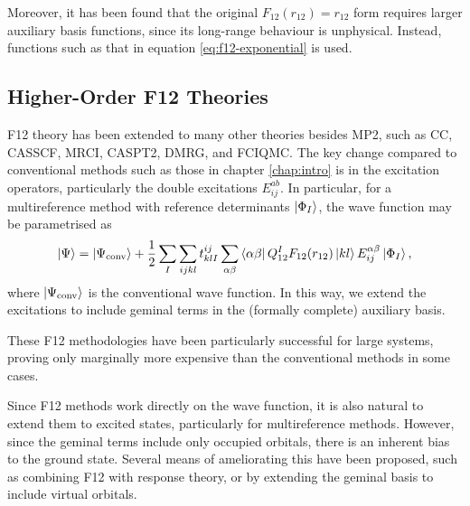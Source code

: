 Moreover, it has been found that the original $F_{12}(r_{12})=r_{12}$ form requires larger auxiliary basis functions, since its long-range behaviour is unphysical.\supercite{ten-noInitiation2004,ten-noNew2007} Instead, functions such as that in equation \ref{eq:f12-exponential} is used.

\subsection{Higher-Order F12 Theories}

F12 theory has been extended to many other theories besides MP2, such as \gls{CC}, \gls{CASSCF}, \gls{MRCI}, \gls{CASPT2}, \gls{DMRG}, and \gls{FCIQMC}.
\supercite{shiozakiMultireference2013,nogaCCR121992,nogaCoupled1994,gdanitzFormulation1993,gdanitzAccurately1998,flieglCoupledcluster2006,neissExtensions2006,kohnModified2009,bokhanCommunications2010,hofenerExtended2019,kedzuchMultireference2011,manbyExplicitly2006,neeseEfficient2009,wernerExplicitly2017,varganovVariational2010,ten-noSimple2007,shiozakiCommunication2010,sharmaSpectroscopic2014}
The key change compared to conventional methods such as those in chapter \ref{chap:intro} is in the excitation operators, particularly the double excitations $E_{ij}^{ab}$. In particular, for a multireference method with reference determinants $\ket{\Phi_I}$, the wave function may be parametrised as
\begin{equation}
    \ket\Psi = \ket{\Psi_\text{conv}} + \frac 12\sum_{I}\sum_{ijkl}t^{ij}_{klI}\sum_{\alpha\beta}\bra{\alpha\beta}Q_{12}^IF_{12}(r_{12})\ket{kl}E_{ij}^{\alpha\beta}\ket{\Phi_I},
\end{equation}
where $\ket{\Psi_\text{conv}}$ is the conventional wave function. In this way, we extend the excitations to include geminal terms in the (formally complete) auxiliary basis.

These F12 methodologies have been particularly successful for large systems, proving only marginally more expensive than the conventional methods in some cases.\supercite{adlerSimple2007,kniziaSimplified2009}

Since F12 methods work directly on the wave function, it is also natural to extend them to excited states, particularly for multireference methods.
\supercite{floresAccurately2005,ten-noSimple2007,shiozakiCommunication2010,shiozakiExplicitly2011,flieglCoupledcluster2006}
However, since the geminal terms include only occupied orbitals, there is an inherent bias to the ground state.\supercite{flieglCoupledcluster2006,neissExtensions2006} Several means of ameliorating this have been proposed, such as combining F12 with response theory,\supercite{neissExtensions2006} or by extending the geminal basis to include virtual orbitals.\supercite{kohnModified2009}

